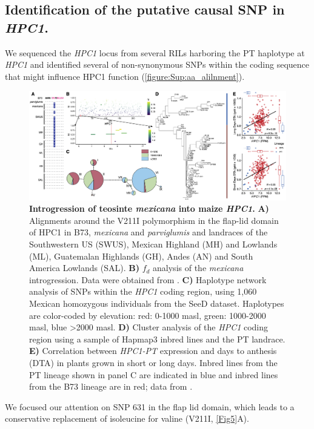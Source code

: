 \documentclass[9pt,twocolumn,twoside,lineno]{biorxiv}
\newcommand{\mex}{\textit{mexicana}\xspace}
\newcommand{\hpc}{\textit{HPC1}\xspace}
\newcommand{\parv}{\textit{parviglumis}\xspace}
\begin{document}
\subsection{Identification of the putative causal SNP in \hpc.}
We sequenced the \hpc locus from several RILs harboring the PT haplotype at \hpc and identified several of non-synonymous SNPs within the coding sequence that might influence HPC1 function (\cref{figure:Sup:aa_alilnment}).
\begin{figure}[!ht]
\begin{center}
\includegraphics[width=0.8\paperwidth]{Figures/Fig_6.png}
\caption{\textbf{Introgression of teosinte \mex into maize \hpc.}  
\textbf{A)} Alignments around the V211I polymorphism in the flap-lid domain of HPC1 in B73, \mex and \parv and landraces of the Southwestern US (SWUS), Mexican Highland (MH) and Lowlands (ML), Guatemalan Highlands (GH), Andes (AN) and South America Lowlands (SAL).
\textbf{B)} \(f_d\) analysis of the \mex introgression. Data were obtained from \cite{Gonzalez-Segovia2019-jy}. 
\textbf{C)} Haplotype network analysis of SNPs within the \hpc coding region, using 1,060 Mexican homozygous individuals from the SeeD dataset. Haplotypes are color-coded by elevation: red: 0-1000 masl, green: 1000-2000 masl, blue >2000 masl.
\textbf{D)} Cluster analysis of the \hpc coding region using a sample of Hapmap3 inbred lines and the PT landrace.
\textbf{E)} Correlation between \textit{HPC1-PT} expression and days to anthesis (DTA) in plants grown in short or long days. 
Inbred lines from the PT lineage shown in panel C are indicated in blue and inbred lines from the B73 lineage are in red;
data from \cite{Kremling2018-gn}.}
\label{Fig6}
\end{center}
\end{figure}
We focused our attention on SNP 631 in the flap lid domain, which leads to a conservative replacement of isoleucine for valine (V211I, \cref{Fig5}A).  
\end{document}
